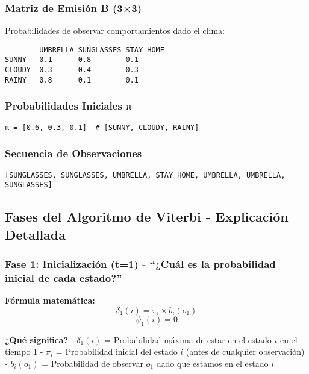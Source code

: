 \documentclass[
]{article}
\begin{document}
\subsubsection{Matriz de Emisión B
(3×3)}\label{matriz-de-emisiuxf3n-b-33}

Probabilidades de observar comportamientos dado el clima:

\begin{verbatim}
        UMBRELLA SUNGLASSES STAY_HOME
SUNNY   0.1      0.8        0.1
CLOUDY  0.3      0.4        0.3
RAINY   0.8      0.1        0.1
\end{verbatim}

\subsubsection{Probabilidades Iniciales
π}\label{probabilidades-iniciales-ux3c0}

\begin{verbatim}
π = [0.6, 0.3, 0.1]  # [SUNNY, CLOUDY, RAINY]
\end{verbatim}

\subsubsection{Secuencia de
Observaciones}\label{secuencia-de-observaciones}

\begin{verbatim}
[SUNGLASSES, SUNGLASSES, UMBRELLA, STAY_HOME, UMBRELLA, UMBRELLA, SUNGLASSES]
\end{verbatim}

\subsection{Fases del Algoritmo de Viterbi - Explicación
Detallada}\label{fases-del-algoritmo-de-viterbi---explicaciuxf3n-detallada}

\subsubsection{Fase 1: Inicialización (t=1) - ``¿Cuál es la probabilidad
inicial de cada
estado?''}\label{fase-1-inicializaciuxf3n-t1---cuuxe1l-es-la-probabilidad-inicial-de-cada-estado}

\textbf{Fórmula matemática:} \[\delta_1(i) = \pi_i \times b_i(o_1)\]
\[\psi_1(i) = 0\]

\textbf{¿Qué significa?} - \(\delta_1(i)\) = Probabilidad máxima de
estar en el estado \(i\) en el tiempo 1 - \(\pi_i\) = Probabilidad
inicial del estado \(i\) (antes de cualquier observación) - \(b_i(o_1)\)
= Probabilidad de observar \(o_1\) dado que estamos en el estado \(i\)
\end{document}
